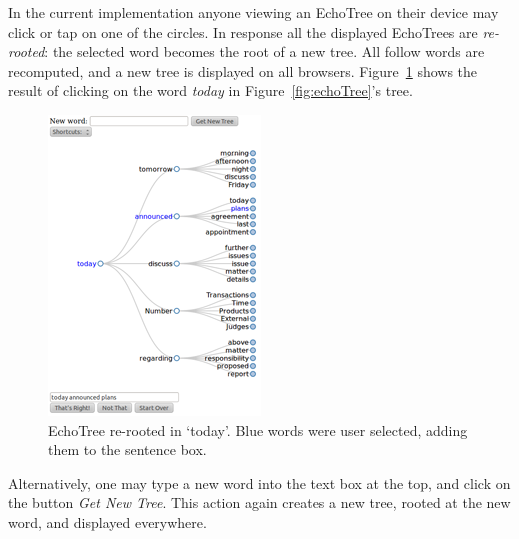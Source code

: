 \documentclass{sigchi}
\begin{document}
In the current implementation anyone viewing an EchoTree on their
device may click or tap on one of the circles. In response all the
displayed EchoTrees are {\em re-rooted}: the selected word becomes the
root of a new tree. All follow words are recomputed, and a new tree is
displayed on all browsers. Figure~\ref{fig:todayTree} shows the result
of clicking on the word {\em today} in Figure~\ref{fig:echoTree}'s
tree. 
\begin{figure}
   \centering
   \includegraphics[width=\columnwidth]{Figs/echoTreeRootTodaySmall.png}
   \caption{EchoTree re-rooted in `today'. Blue words were user
     selected, adding them to the sentence box.}
   \label{fig:todayTree}
\end{figure}
Alternatively, one may type a new word into the text box at the top,
and click on the button {\em Get New Tree}. This action again creates
a new tree, rooted at the new word, and displayed everywhere.
\end{document}
